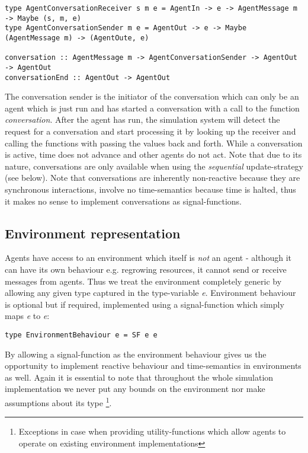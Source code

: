 \begin{verbatim}
type AgentConversationReceiver s m e = AgentIn -> e -> AgentMessage m -> Maybe (s, m, e)
type AgentConversationSender m e = AgentOut -> e -> Maybe (AgentMessage m) -> (AgentOute, e)
                                        
conversation :: AgentMessage m -> AgentConversationSender -> AgentOut -> AgentOut
conversationEnd :: AgentOut -> AgentOut 
\end{verbatim}

The conversation sender is the initiator of the conversation which can only be an agent which is just run and has started a conversation with a call to the function \textit{conversation}. After the agent has run, the simulation system will detect the request for a conversation and start processing it by looking up the receiver and calling the functions with passing the values back and forth. While a conversation is active, time does not advance and other agents do not act. Note that due to its nature, conversations are only available when using the \textit{sequential} update-strategy (see below). Note that conversations are inherently non-reactive because they are synchronous interactions, involve no time-semantics because time is halted, thus it makes no sense to implement conversations as signal-functions.

\subsection{Environment representation}
Agents have access to an environment which itself is \textit{not} an agent - although it can have its own behaviour e.g. regrowing resources, it cannot send or receive messages from agents. Thus we treat the environment completely generic by allowing any given type captured in the type-variable \textit{e}. Environment behaviour is optional but if required, implemented using a signal-function which simply maps \textit{e} to \textit{e}:

\begin{verbatim}
type EnvironmentBehaviour e = SF e e
\end{verbatim}

By allowing a signal-function as the environment behaviour gives us the opportunity to implement reactive behaviour and time-semantics in environments as well. Again it is essential to note that throughout the whole simulation implementation we never put any bounds on the environment nor make assumptions about its type \footnote{Exceptions in case when providing utility-functions which allow agents to operate on existing environment implementations}.

